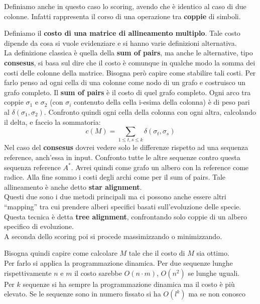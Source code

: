 \documentclass[a4paper,12pt, oneside]{book}
\begin{document}
\begin{definizione}
  Definiamo anche in questo caso lo scoring, avendo che è identico al caso di
  due colonne. Infatti rappresenta il corso di una operazione tra
  \textbf{coppie} di simboli.
\end{definizione}
\begin{definizione}
  Definiamo il \textbf{costo di una matrice di allineamento multiplo}. Tale
  costo dipende da cosa si vuole evidenziare e si hanno varie definizioni
  alternativa. \\
  La definizione classica è quella della \textbf{sum of pairs}, ma anche le
  alternative, tipo \textbf{consesus}, si basa sul dire che il costo è comunque
  in qualche modo la somma dei costi delle colonne della matrice. Bisogna però
  capire come stabilire tali costi. Per farlo penso ad ogni cella di una colonne
  come nodo di un grafo e costruisco un grafo completo. Il \textbf{sum of pairs}
  è il costo di quel grafo completo. Ogni arco tra coppie $\sigma_1$ e
  $\sigma_2$ (con $\sigma_i$ contenuto della cella i-esima della colonna) è di
  peso pari al $\delta(\sigma_1,\sigma_2)$. Confronto quindi ogni cella della
  colonna con ogni altra, calcolando il delta, e faccio la sommatoria:
  \[c(M)=\sum_{1\leq t,s\leq k} \delta(\sigma_t,\sigma_s)\]
  Nel caso del \textbf{consesus} dovrei vedere solo le differenze rispetto ad
  una sequenza reference, anch'essa in input. Confronto tutte le altre sequenze
  contro questa sequenza reference $A^*$. Avrei quindi come grafo un albero con
  la reference come radice. Alla fine sommo i costi degli archi come per il sum
  of pairs. Tale allineamento è anche detto \textbf{star alignment}.\\
  Questi due sono i due metodi principali ma ci possono anche essere altri
  ``mapping'' tra cui prendere alberi specifici basati sull'evoluzione delle
  specie. Questa tecnica è detta \textbf{tree alignment}, confrontando solo
  coppie di un albero specifico di evoluzione.\\
  A seconda dello scoring poi si procede massimizzando o minimizzando.
\end{definizione}
Bisogna quindi capire come calcolare $M$ tale che il costo di $M$ sia ottimo.\\
Per farlo si applica la programmazione dinamica. Per due sequenze lunghe
rispettivamente $n$ e $m$ il costo sarebbe $O(n\cdot m)$, $O(n^2)$ se lunghe
uguali.\\
Per $k$ sequenze si ha sempre la programmazione dinamica ma il costo è più
elevato. Se le sequenze sono in numero fissato si ha $O(l^k)$ ma se non conosco
\end{document}
